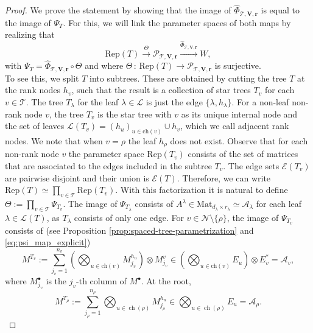 \documentclass[12pt]{article}
\theoremstyle{definition}
\numberwithin{theorem}{section}
\begin{document}
\TTNisSpacedTree*
\begin{proof}
We prove the statement by showing that the image of $\widehat{\Phi}_{\mathscr{T}, \mathbf{V}, \mathbf{r}}$ is equal to the image of $\Psi_T$. For this, we will link the parameter spaces of both maps by realizing that
\begin{equation*}
    \mathrm{Rep}(T) \overset{\Theta}{\longrightarrow} \mathcal{P}_{\mathscr{T}, \mathbf{V}, \mathbf{r}} \overset{\widehat{\Phi}_{\mathscr{T}, \mathbf{V}, \mathbf{r}}}{\longrightarrow} W,
\end{equation*}
with $\Psi_T = \widehat{\Phi}_{\mathscr{T}, \mathbf{V}, \mathbf{r}} \circ \Theta$ and where $\Theta \, : \, \mathrm{Rep}(T) \longrightarrow \mathcal{P}_{\mathscr{T}, \mathbf{V}, \mathbf{r}}$ is surjective.
\\
To see this, we split $T$ into subtrees. These are obtained by cutting the tree $T$ at the  rank nodes $h_v$, such that the result is a collection of star trees $T_v$ for each $v \in \mathscr{T}$. The tree $T_\lambda$ for the leaf $\lambda \in \mathcal{L}$ is just the edge $\{\lambda, h_\lambda\}$. For a non-leaf non-rank node $v$, the tree $T_v$ is the star tree with $v$ as its unique internal node and the set of leaves $\mathcal{L}(T_v) = (h_u)_{u \in \mathrm{ch}(v)} \cup h_v$, which we call adjacent rank nodes. We note that when $v=\rho$ the leaf $h_\rho$ does not exist. Observe that
for each non-rank node $v$ the parameter space $\mathrm{Rep}(T_v)$ consists of the set of matrices that are associated to the edges included in the subtree $T_v$. The edge sets $\mathcal{E}(T_v)$ are pairwise disjoint and their union is $\mathcal{E}(T)$. Therefore, we can write $\mathrm{Rep}(T) \simeq \prod_{v\in \mathscr{T}}\mathrm{Rep}(T_v)$. With this factorization it is natural to define $\Theta:=\prod_{v \in \mathscr{T}} \Psi_{T_v}$. The image of $\Psi_{T_\lambda}$ consists of $A^\lambda \in \mathrm{Mat}_{ d_\lambda\times r_\lambda} \simeq \mathcal{A}_\lambda$ 
for each leaf $\lambda \in \mathcal L(T)$, as $T_\lambda$ consists of only one edge. For $v\in\mathscr{N}\setminus\{\rho\}$, the image of
$\Psi_{T_v}$ consists of (see Proposition \ref{prop:spaced-tree-parametrization} and \eqref{eq:psi_map_explicit})
\begin{equation}\label{eq:matrix_space_T_v}
    M^{T_v} := \sum_{j_v=1}^{n_v} \left(\bigotimes_{u \in \mathrm{ch}(v)}  M^{h_u}_{j_v} \right)\otimes M^{v}_{j_v}\in \left( \bigotimes_{u \in \mathrm{ch}(v)} E_u \right)\otimes E_v^* = \mathcal A_v,
\end{equation}
where $M^\bullet_{j_v}$ is the $j_v$-th column of $M^\bullet$. At the root,
\begin{equation*}
    M^{T_\rho}
:=
\sum_{j_\rho=1}^{n_\rho}
\bigotimes_{u\in\operatorname{ch}(\rho)}M_{j_\rho}^{h_u}
\in
\bigotimes_{u\in\operatorname{ch}(\rho)}E_u
=
\mathcal A_\rho.
\end{equation*}


\end{proof}
\end{document}
